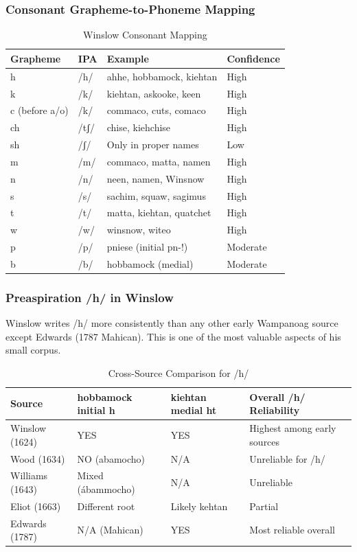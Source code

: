 \subsubsection{Consonant Grapheme-to-Phoneme Mapping}

\begin{table}[htbp]
\centering
\caption{Winslow Consonant Mapping}
\label{tab:1366-consonants}
\begin{tabular}{llll}
\hline
Grapheme & IPA & Example & Confidence \\
\hline
h & /h/ & ahhe, hobbamock, kiehtan & High \\
k & /k/ & kiehtan, askooke, keen & High \\
c (before a/o) & /k/ & commaco, cuts, comaco & High \\
ch & /tʃ/ & chise, kiehchise & High \\
sh & /ʃ/ & Only in proper names & Low \\
m & /m/ & commaco, matta, namen & High \\
n & /n/ & neen, namen, Winsnow & High \\
s & /s/ & sachim, squaw, sagimus & High \\
t & /t/ & matta, kiehtan, quatchet & High \\
w & /w/ & winsnow, witeo & High \\
p & /p/ & pniese (initial pn-!) & Moderate \\
b & /b/ & hobbamock (medial) & Moderate \\
\hline
\end{tabular}
\end{table}

\subsubsection{Preaspiration /h/ in Winslow}

Winslow writes /h/ more consistently than any other early Wampanoag source
except Edwards (1787 Mahican). This is one of the most valuable aspects of his
small corpus.

\begin{table}[htbp]
\centering
\caption{Cross-Source Comparison for /h/}
\label{tab:1366-h}
\begin{tabular}{llll}
\hline
Source & hobbamock initial h & kiehtan medial ht & Overall /h/ Reliability \\
\hline
Winslow (1624) & YES & YES & Highest among early sources \\
Wood (1634) & NO (abamocho) & N/A & Unreliable for /h/ \\
Williams (1643) & Mixed (ábammocho) & N/A & Unreliable \\
Eliot (1663) & Different root & Likely kehtan & Partial \\
Edwards (1787) & N/A (Mahican) & YES & Most reliable overall \\
\hline
\end{tabular}
\end{table}

